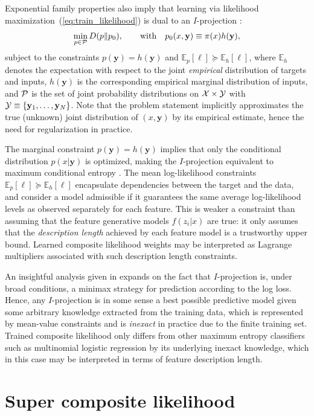 \documentclass[english]{scrartcl}
\def\y{{\mathbf{y}}}
\newcommand{\bell}{{\boldsymbol{\ell}}}
\newcommand{\E}{\mathbb{E}}
\begin{document}
Exponential family properties also imply that learning via likelihood maximization~(\ref{eq:train_likelihood}) is dual to an $I$-projection \cite{Csiszar-84}: 
\begin{equation}
\label{eq:i_proj}
\min_{p\in{\cal P}} D(p\|p_0),
\qquad \text{with} \quad
p_0(x,\y) \equiv \pi(x)h(\y),
\end{equation}
subject to the constraints $p(\y)=h(\y)$ and $\E_p[\bell] \succeq \E_h[\bell]$, where $\E_h$ denotes the expectation with respect to the joint {\em empirical} distribution of targets and inputs, $h(\y)$ is the corresponding empirical marginal distribution of inputs, and ${\cal P}$ is the set of joint probability distributions on ${\cal X}\times {\cal Y}$ with ${\cal Y}\equiv\{\y_1,\ldots,\y_N\}$. Note that the problem statement implicitly approximates the true (unknown) joint distribution of $(x,\y)$ by its empirical estimate, hence the need for regularization in practice.

The marginal constraint $p(\y)=h(\y)$ implies that only the conditional distribution $p(x|\y)$ is optimized, making the $I$-projection equivalent to maximum conditional entropy \cite{BergerA-96}. The mean log-likelihood constraints $\E_p[\bell] \succeq \E_h[\bell]$ encapsulate dependencies between the target and the data, and consider a model admissible if it guarantees the same average log-likelihood levels as observed separately for each feature. This is weaker a constraint than assuming that the feature generative models $f(z_i|x)$ are true: it only assumes that the {\em description length} \cite{Grunwald-07} achieved by each feature model is a trustworthy upper bound. Learned composite likelihood weights may be interpreted as Lagrange multipliers associated with such description length constraints. 

An insightful analysis given in \cite{Grunwald-04} expands on the fact that $I$-projection is, under broad conditions, a minimax strategy for prediction according to the log loss. Hence, any $I$-projection is in some sense a best possible predictive model given some arbitrary knowledge extracted from the training data, which is represented by mean-value constraints and is {\em inexact} in practice due to the finite training set. Trained composite likelihood only differs from other maximum entropy classifiers such as multinomial logistic regression by its underlying inexact knowledge, which in this case may be interpreted in terms of feature description length.


\section{Super composite likelihood}
\label{sec:super}
\end{document}
